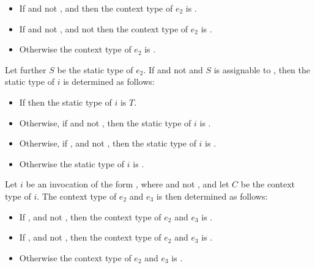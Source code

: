 \documentclass[makeidx]{article}
\begin{document}
{\begin{itemize}
  \item{} If  and not ,
      and 
      then the context type of $e_2$ is .
  \item{} If  and not ,
      and not 
     then the context type of $e_2$ is .
  \item{} Otherwise the context type of $e_2$ is .
\end{itemize}

\LMHash{}%
Let further $S$ be the static type of $e_2$.
If  and not 
and $S$ is assignable to ,
then the static type of $i$ is determined as follows:

\begin{itemize}
  \item{} If 
    then the static type of $i$ is $T$.
  \item{} Otherwise, if 
    and not ,
    then the static type of $i$ is .
  \item{} Otherwise, if ,
     and not ,
    then the static type of $i$ is .
  \item{} Otherwise the static type of $i$ is .
\end{itemize}

\LMHash{}%
Let $i$ be an invocation of the form ,
where  and not ,
and let $C$ be the context type of $i$.
The context type of $e_2$ and $e_3$ is then determined as follows:

\begin{itemize}
  \item{} If ,
     and not ,
    then the context type of $e_2$ and $e_3$ is .
  \item{} If ,
     and not ,
    then the context type of $e_2$ and $e_3$ is .
  \item{} Otherwise the context type of $e_2$ and $e_3$ is .
\end{itemize}

}
\end{document}
